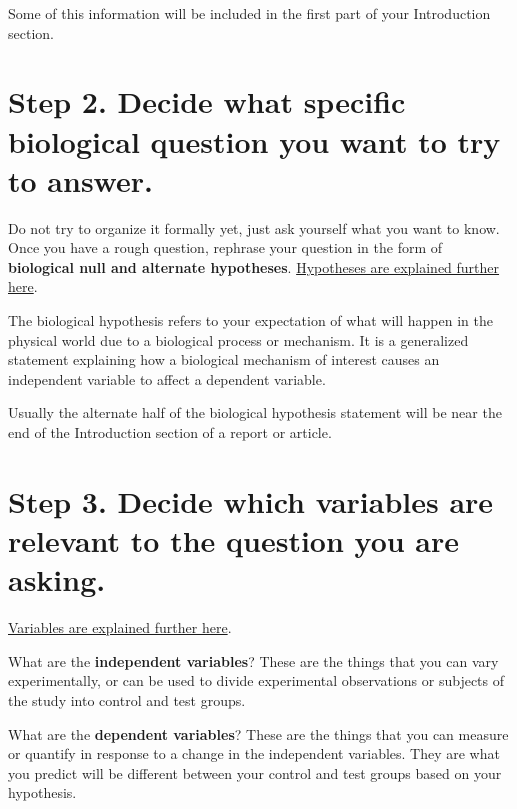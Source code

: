 \documentclass[
]{book}
\begin{document}
Some of this information will be included in the first part of your Introduction section.

\hypertarget{step-2.-decide-what-specific-biological-question-you-want-to-try-to-answer.}{%
\section*{Step 2. Decide what specific biological question you want to try to answer.}\label{step-2.-decide-what-specific-biological-question-you-want-to-try-to-answer.}}

Do not try to organize it formally yet, just ask yourself what you want to know. Once you have a rough question, rephrase your question in the form of \textbf{biological null and alternate hypotheses}. \protect\hyperlink{hypothesis200}{Hypotheses are explained further here}.

The biological hypothesis refers to your expectation of what will happen in the physical world due to a biological process or mechanism. It is a generalized statement explaining how a biological mechanism of interest causes an independent variable to affect a dependent variable.

Usually the alternate half of the biological hypothesis statement will be near the end of the Introduction section of a report or article.

\hypertarget{step-3.-decide-which-variables-are-relevant-to-the-question-you-are-asking.}{%
\section*{Step 3. Decide which variables are relevant to the question you are asking.}\label{step-3.-decide-which-variables-are-relevant-to-the-question-you-are-asking.}}

\protect\hyperlink{variables215}{Variables are explained further here}.

What are the \textbf{independent variables}? These are the things that you can vary experimentally, or can be used to divide experimental observations or subjects of the study into control and test groups.

What are the \textbf{dependent variables}? These are the things that you can measure or quantify in response to a change in the independent variables. They are what you predict will be different between your control and test groups based on your hypothesis.
\end{document}

